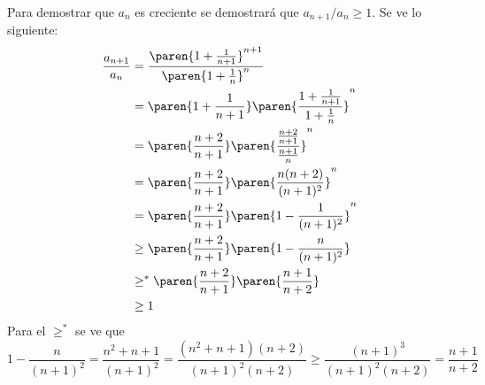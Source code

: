 \documentclass{ayudantia}
\begin{document}
\begin{ans}
    \begin{sol}
        Para demostrar que \(a_n\) es creciente se demostrará que \(a_{n+1}/a_n\geq1\). Se ve lo siguiente:
        \begin{align*}
            \frac{a_{n+1}}{a_n}&=\frac{\paren{1+\frac1{n+1}}^{n+1}}{\paren{1+\frac1n}^n}\\
            &=\paren{1+\frac1{n+1}}\paren{\frac{1+\frac1{n+1}}{1+\frac1n}}^n\\
            &=\paren{\frac{n+2}{n+1}}\paren{\frac{\frac{n+2}{n+1}}{\frac{n+1}n}}^n\\
            &=\paren{\frac{n+2}{n+1}}\paren{\frac{n(n+2)}{(n+1)^2}}^n\\
            &=\paren{\frac{n+2}{n+1}}\paren{1-\frac1{(n+1)^2}}^n\\
            &\geq\paren{\frac{n+2}{n+1}}\paren{1-\frac{n}{(n+1)^2}}\\
            &\geq^*\paren{\frac{n+2}{n+1}}\paren{\frac{n+1}{n+2}}\\
            &\geq1\\
        \end{align*}
        Para el \(\geq^*\) se ve que
        \begin{equation*}
            1-\frac{n}{(n+1)^2}=\frac{n^2+n+1}{(n+1)^2}=\frac{(n^2+n+1)(n+2)}{(n+1)^2(n+2)}\geq\frac{(n+1)^3}{(n+1)^2(n+2)}=\frac{n+1}{n+2}
        \end{equation*}
    \end{sol}
\end{ans}
\end{document}

